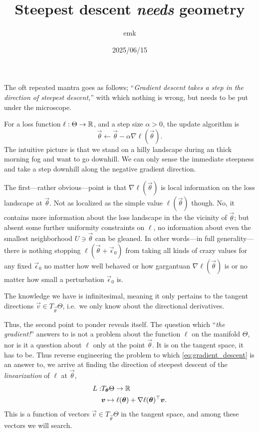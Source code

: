\documentclass[12pt]{amsart}
\title{Steepest descent \emph{needs} geometry}
\author{emk}
\date{2025/06/15}
\begin{document}
\maketitle

The oft repeated mantra goes as follows; ``\emph{Gradient descent takes a step in the direction of steepest descent,}'' with which nothing is wrong, but needs to be put under the microscope.

For a loss function $\ell : \Theta \to \mathbb{R}$, and a step size $\alpha > 0$, the update algorithm is
\begin{equation}\label{eq:gradient_descent}
	\vec{\theta} \leftarrow \vec{\theta} - \alpha \nabla \ell(\vec{\theta}).
\end{equation}
The intuitive picture is that we stand on a hilly landscape during an thick morning fog and want to go downhill. We can only sense the immediate steepness and take a step downhill along the negative gradient direction. 

The first---rather obvious---point is that $\nabla \ell(\vec{\theta})$ is local information on the loss landscape at $\vec{\theta}$. Not as localized as the simple value $\ell(\vec{\theta})$ though. No, it contains more information about the loss landscape in the the vicinity of $\vec{\theta}$; but absent some further uniformity constraints on $\ell$, no information about even the smallest neighborhood $U \ni \vec{\theta}$ can be gleaned. In other words---in full generality---there is nothing stopping $\ell(\vec{\theta} + \vec{\epsilon}_0)$ from taking all kinds of crazy values for any fixed $\vec{\epsilon}_0$ no matter how well behaved or how gargantuan $\nabla \ell(\vec{\theta})$ is or no matter how small a perturbation $\vec{\epsilon}_0$ is. 

The knowledge we have is infinitesimal, meaning it only pertains to the tangent directions $\vec{v} \in T_{\vec{\theta}}\Theta$, i.e.\ we only know about the directional derivatives. 

Thus, the second point to ponder reveals itself. The question which ``\emph{the gradient!}'' answers to is not a problem about the function $\ell$ on the manifold $\Theta$, nor is it a question about $\ell$ only at the point $\vec{\theta}$. It is on the tangent space, it has to be. Thus reverse engineering the problem to which \eqref{eq:gradient_descent} is an answer to, we arrive at finding the direction of steepest descent of the  \emph{linearization} of $\ell$ at $\vec{\theta}$, 
\begin{align*}
L:& T_{\mathbf{\boldsymbol{\theta}}}\Theta \rightarrow  \mathbb{R}\\
&\mathbf{\boldsymbol{v}} \mapsto \ell(\mathbf{\boldsymbol{\theta}}) + \nabla \ell(\mathbf{\boldsymbol{\theta}})^\top \mathbf{\boldsymbol{v}}.
\end{align*} 
This is a function of vectors $\vec{v} \in T_{\vec{\theta}}\Theta$ in the tangent space, and among these vectors we will search.
 
\end{document}
